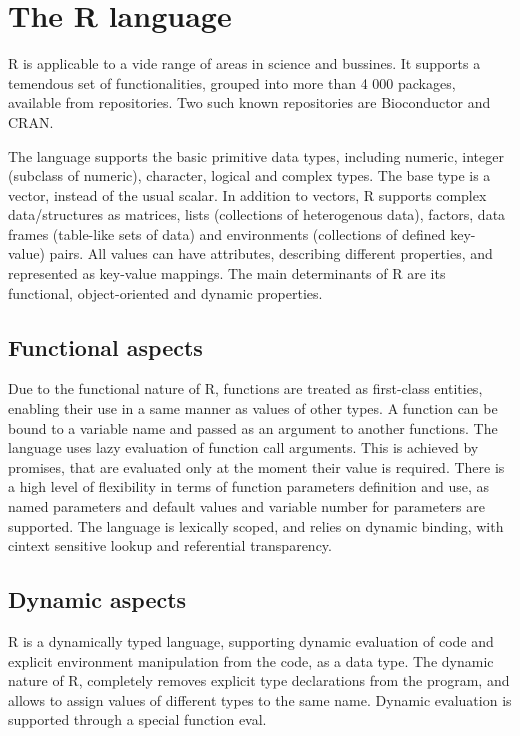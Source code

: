 \documentclass{sigplanconf}
\begin{document}
\section{The R language}
R is applicable to a vide range of areas in science and bussines. It supports a temendous set of functionalities, grouped into more than 4 000 packages, available from repositories. 
Two such known repositories are Bioconductor and CRAN. 

The language supports the basic primitive data types, including numeric, integer (subclass of numeric), character, logical and complex types. The base type is a vector, instead of the usual scalar.
In addition to vectors, R supports complex data/structures as matrices, lists (collections of heterogenous data), factors, data frames (table-like sets of data) and environments (collections of 
defined key-value) pairs. All values can have attributes, describing different properties, and represented as key-value mappings.
The main determinants of R are its functional, object-oriented and dynamic properties. 

\subsection{Functional aspects}
Due to the functional nature of R, functions are treated as first-class entities, enabling their use in a same manner as values of other types. A function can be bound to a variable name and
passed as an argument to another functions. The language uses lazy evaluation of function call arguments. This is achieved by promises, that are evaluated only at the moment their value is required.
There is a high level of flexibility in terms of function parameters definition and use, as named parameters and default values and variable number for parameters are supported. 
The language is lexically scoped, and relies on dynamic binding, with cintext sensitive lookup and referential transparency.

\subsection{Dynamic aspects}
R is a dynamically typed language, supporting dynamic evaluation of code and explicit environment manipulation from the code, as a data type. The dynamic nature of R, completely removes explicit type declarations
from the program, and allows to assign values of different types to the same name. Dynamic evaluation is supported through a special function eval.
\end{document}
